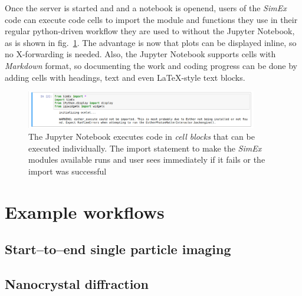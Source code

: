 \documentclass[10pt]{scrartcl}
\begin{document}
%
Once the server is started and and a notebook is openend, users of the \textit{SimEx} code can execute code cells
to import the module and functions they use in their regular python-driven workflow they are used to without the Jupyter Notebook, as is shown in fig.~\ref{fig:simex_import}.
The advantage is now that plots can be displayed inline, so no X-forwarding is needed.
Also, the Jupyter Notebook supports cells with \textit{Markdown} format, so documenting the work and coding progress can be done by adding cells with headings, text and even \LaTeX -style text blocks.
%
\begin{figure}
 \centering
 \includegraphics[width=0.9\textwidth]{figures/simex_import_jhub.png}
 \caption{The Jupyter Notebook executes code in \textit{cell blocks} that can be executed individually. The import statement to make the \textit{SimEx} modules available runs and user sees immediately if it fails or the import was successful}
 \label{fig:simex_import}
\end{figure}
%
\FloatBarrier
\printbibliography[title={References}]
%
%
%
%
\FloatBarrier
\appendix
\section{Example workflows}
\label{appendix:notebooks}
\subsection{Start--to--end single particle imaging}

%
\subsection{Nanocrystal diffraction}

%
\end{document}
